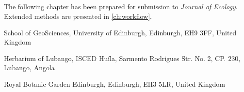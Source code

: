 \begin{refsection}




\chapter[\chaptertitle]{\chaptertitle}
\label{ch:tls}

The following chapter has been prepared for submission to \textit{Journal of Ecology}. Extended methods are presented in \autoref{ch:workflow}.


\begin{paperaffil}
\item{School of GeoSciences, University of Edinburgh, Edinburgh, EH9 3FF, United Kingdom}
\item{Herbarium of Lubango, ISCED Hu\'{i}la, Sarmento Rodrigues Str. No. 2, CP. 230, Lubango, Angola}
\item{Royal Botanic Garden Edinburgh, Edinburgh, EH3 5LR, United Kingdom}
\end{paperaffil}



\end{refsection}
